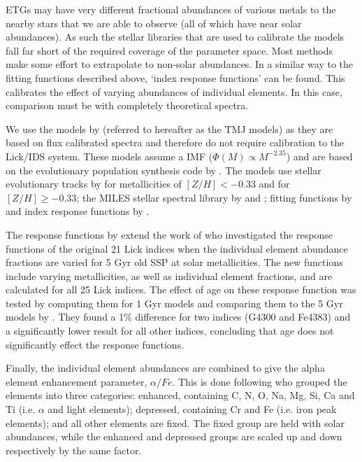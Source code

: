 		ETGs may have very different fractional abundances of various metals to the nearby stars that we are able to observe (all of which have near solar abundances). As such the stellar libraries that are used to calibrate the models fall far short of the required coverage of the parameter space. Most methods make some effort to extrapolate to non-solar abundances. In a similar way to the fitting functions described above, `index response functions' can be found. This calibrates the effect of varying abundances of individual elements. In this case, comparison must be with completely theoretical spectra.

		We use the models by \citet{Thomas2010} (referred to hereafter as the TMJ models) as they are based on flux calibrated spectra and therefore do not require calibration to the Lick/IDS system. These models assume a \citet{Salpeter1955} IMF ($\Phi(M) \propto M^{-2.35}$) and are based on the evolutionary population synthesis code by \citet{Maraston1998}. The models use stellar evolutionary tracks by \citet{Cassisi1997} for metallicities of $[Z/H] < -0.33$ and \citet{Girardi2000} for $[Z/H] \ge -0.33$; the MILES stellar spectral library by \citet{Sanchez-Blazquez2006a} and \citet{Falcon-Barroso2011a}; fitting functions by \citet{Johansson2010} and index response functions by \citet{Korn2005}.

		The response functions by \citet{Korn2005} extend the work of \citet{Tripicco1995} who investigated the response functions of the original 21 Lick indices when the individual element abundance fractions are varied for 5 Gyr old SSP at solar metallicities. The new functions include varying metallicities, as well as individual element fractions, and are calculated for all 25 Lick indices. The effect of age on these response function was tested by computing them for 1 Gyr models and comparing them to the 5 Gyr models by \citet{Tripicco1995}. They found a 1\% difference for two indices (G4300 and Fe4383) and a significantly lower result for all other indices, concluding that age does not significantly effect the response functions.

		Finally, the individual element abundances are combined to give the alpha element enhancement parameter, $\alpha/Fe$. This is done following \citet{Trager2000} who grouped the elements into three categories: enhanced, containing C, N, O, Na, Mg, Si, Ca and Ti (i.e. $\alpha$ and light elements); depressed, containing Cr and Fe (i.e. iron peak elements); and all other elements are fixed. The fixed group are held with solar abundances, while the enhanced and depressed groups are scaled up and down respectively by the same factor. 

